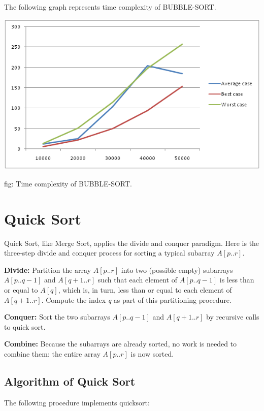 \documentclass[12 pt,a4paper]{report}
\begin{document}
The following graph represents time complexity of BUBBLE-SORT.

\vspace{1cm}

\includegraphics{bubble sort.png}

\hspace{5cm}fig: Time complexity of BUBBLE-SORT.

\section{Quick Sort}

Quick Sort, like Merge Sort, applies the divide and conquer paradigm. Here is the three-step divide and conquer process for sorting a typical subarray $A[p..r]$.

\textbf{Divide:} Partition the array $A[p..r]$ into two (possible empty) subarrays $A[p..q-1]$ and $A[q+1..r]$ such that each element of $A[p..q-1]$ is less than or equal to $A[q]$, which is, in turn, less than or equal to each element of $A[q+1..r]$. Compute the index \textit{q} as part of this partitioning procedure.

\textbf{Conquer:} Sort the two subarrays $A[p..q-1]$ and $A[q+1..r]$ by recursive calls to quick sort.

\textbf{Combine:} Because the subarrays are already sorted, no work is needed to combine them: the entire array $A[p..r]$ is now sorted.

\subsection{Algorithm of Quick Sort}

The following procedure implements quicksort:

\vspace{1cm}
\end{document}
